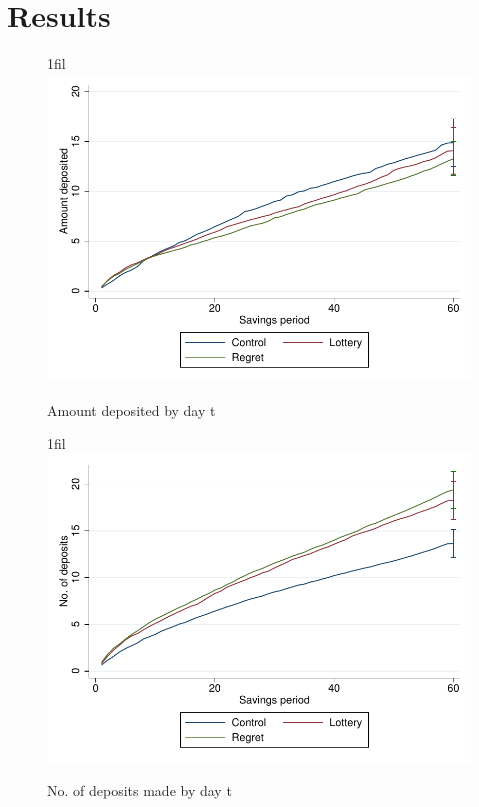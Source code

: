 \documentclass[10pt]{article}
\makeatletter
\newcommand*{\centerfloat}{\parindent \z@ \leftskip \z@ \@plus 1fil \@minus \textwidth \rightskip \leftskip \parfillskip \z@skip}
\makeatother
\begin{document}
\section{Results} \label{sec:results}
	
	
	
	
	
	
	\begin{landscape}  \end{landscape}
	\begin{landscape}  \end{landscape}
	\begin{landscape}  \end{landscape}
	\begin{landscape}  \end{landscape}

\clearpage

	\begin{figure}[!htb]
	\centering
	\caption{Amount deposited by day t}
	\centerfloat
	\includegraphics{../../figures/line-cumdepositamount.pdf}
	\end{figure}

	\begin{figure}[!htb]
	\centering
	\caption{No. of deposits made by day t}
	\centerfloat
	\includegraphics{../../figures/line-cumdeposits.pdf}
	\end{figure}

\clearpage



\end{document}
